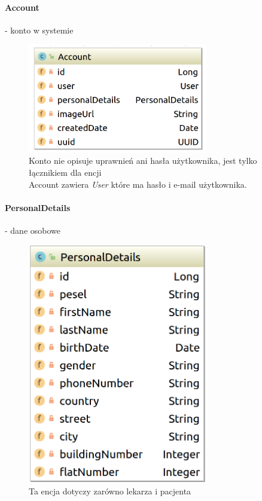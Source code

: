 \documentclass[polish,12pt]{aghthesis}
\begin{document}
    \paragraph{Account} - konto w systemie 
    \begin{figure}[H]
    \includegraphics[width=0.7\textwidth]{Account}
    \caption{Konto nie opisuje uprawnień ani hasła użytkownika, jest tylko łącznikiem dla encji \\
    Account zawiera \emph{User} które ma hasło i e-mail użytkownika.}
    \end{figure}
    \paragraph{PersonalDetails} - dane osobowe 
    \begin{figure}[H]
        \includegraphics[width=0.7\textwidth]{PersonalDetails}
        \caption{Ta encja dotyczy zarówno lekarza i pacjenta}
    \end{figure}
\end{document}
